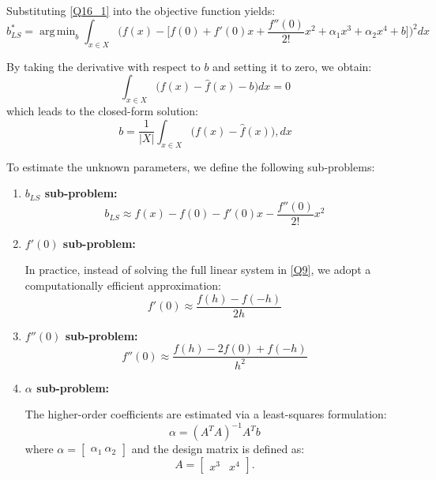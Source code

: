 \documentclass{elsarticle}
\DeclareMathOperator*{\argmin}{arg\,min}
\begin{document}
Substituting \eqref{Q16_1} into the objective function yields:
\begin{equation}\label{Q17_1}
	b^*_{LS}=\argmin_{b}\int_{x\in X}\Big(f(x)-\big[f(0)+f'(0)x+\frac{f''(0)}{2!}x^2+\alpha_1 x^3+\alpha_2 x^4 + b \big]\Big)^2 dx
\end{equation}

By taking the derivative with respect to $b$ and setting it to zero, we obtain:
\begin{equation}\label{Q18_1}
	\int_{x\in X}\Big(f(x)-\hat{f}(x)-b\Big) dx = 0
\end{equation}
which leads to the closed-form solution:
\begin{equation}\label{Q19_1}
	b = \frac{1}{|X|}\int_{x\in X} \big(f(x)-\hat{f}(x)\big),dx
\end{equation}

To estimate the unknown parameters, we define the following sub-problems:

\begin{enumerate}
	
	\item \textbf{$b_{LS}$ sub-problem:}
	\begin{equation}\label{Q20_1}
		b_{LS} \approx f(x)-f(0)-f'(0)x-\frac{f''(0)}{2!}x^2
	\end{equation}
	
	\item \textbf{$f'(0)$ sub-problem:}
	
	In practice, instead of solving the full linear system in \eqref{Q9}, we adopt a computationally efficient approximation:
	\begin{equation}\label{Q22_1}
		f'(0)\approx \frac{f(h)-f(-h)}{2h}
	\end{equation}
	
	\item \textbf{$f''(0)$ sub-problem:}
	\begin{equation}\label{Q23_1}
		f''(0)\approx \frac{f(h)-2f(0)+f(-h)}{h^2}
	\end{equation}
	
	\item \textbf{$\alpha$ sub-problem:}
	
	The higher-order coefficients are estimated via a least-squares formulation:
	\begin{equation}\label{Q21_1}
		\alpha = (A^{T}A)^{-1}A^{T}b
	\end{equation}
	where $\alpha=\begin{bmatrix}\alpha_1 \ \alpha_2\end{bmatrix}$ and the design matrix is defined as:
	\[
	A = \begin{bmatrix} x^3 & x^4 \end{bmatrix}.
	\]
	
\end{enumerate}
\end{document}
